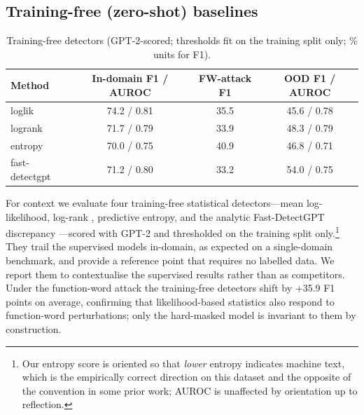 \documentclass[11pt]{article}
\begin{document}
\subsection{Training-free (zero-shot) baselines}\label{sec:zeroshot}
\begin{table}[H]\centering
\caption{Training-free detectors (GPT-2-scored; thresholds fit on the training split only; \% units for F1).}
\label{tab:zeroshot}
\small
\begin{tabular}{lccc}
\toprule
Method & In-domain F1 / AUROC & FW-attack F1 & OOD F1 / AUROC \\
\midrule
loglik & 74.2 / 0.81 & 35.5 & 45.6 / 0.78 \\
logrank & 71.7 / 0.79 & 33.9 & 48.3 / 0.79 \\
entropy & 70.0 / 0.75 & 40.9 & 46.8 / 0.71 \\
fast-detectgpt & 71.2 / 0.80 & 33.2 & 54.0 / 0.75 \\
\bottomrule
\end{tabular}
\end{table}
For context we evaluate four training-free statistical detectors---mean log-likelihood, log-rank \cite{gltr}, predictive entropy, and the analytic Fast-DetectGPT discrepancy \cite{fastdetectgpt}---scored with GPT-2 and thresholded on the training split only.\footnote{Our entropy score is oriented so that \emph{lower} entropy indicates machine text, which is the empirically correct direction on this dataset and the opposite of the convention in some prior work; AUROC is unaffected by orientation up to reflection.} They trail the supervised models in-domain, as expected on a single-domain benchmark, and provide a reference point that requires no labelled data. We report them to contextualise the supervised results rather than as competitors.
Under the function-word attack the training-free detectors shift by +35.9 F1 points on average, confirming that likelihood-based statistics also respond to function-word perturbations; only the hard-masked model is invariant to them by construction.
\end{document}
